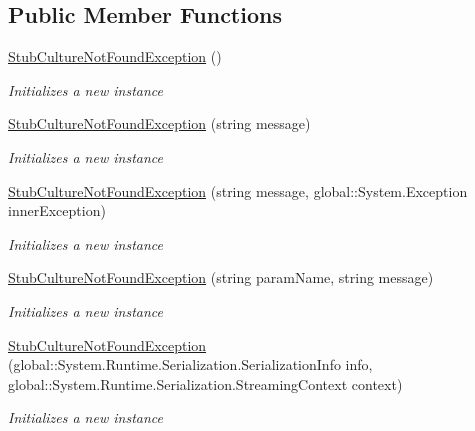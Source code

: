 \subsection*{Public Member Functions}
\begin{DoxyCompactItemize}
\item 
\hyperlink{class_system_1_1_globalization_1_1_fakes_1_1_stub_culture_not_found_exception_adcf0eece1199927a6dc50173ee7ad98c}{Stub\-Culture\-Not\-Found\-Exception} ()
\begin{DoxyCompactList}\small\item\em Initializes a new instance\end{DoxyCompactList}\item 
\hyperlink{class_system_1_1_globalization_1_1_fakes_1_1_stub_culture_not_found_exception_a29f950e846c473945013e507a422dcc8}{Stub\-Culture\-Not\-Found\-Exception} (string message)
\begin{DoxyCompactList}\small\item\em Initializes a new instance\end{DoxyCompactList}\item 
\hyperlink{class_system_1_1_globalization_1_1_fakes_1_1_stub_culture_not_found_exception_a6c06c99c44ff4f4aef65d53683210785}{Stub\-Culture\-Not\-Found\-Exception} (string message, global\-::\-System.\-Exception inner\-Exception)
\begin{DoxyCompactList}\small\item\em Initializes a new instance\end{DoxyCompactList}\item 
\hyperlink{class_system_1_1_globalization_1_1_fakes_1_1_stub_culture_not_found_exception_a92628af440fa433d4c862d8e0c215db1}{Stub\-Culture\-Not\-Found\-Exception} (string param\-Name, string message)
\begin{DoxyCompactList}\small\item\em Initializes a new instance\end{DoxyCompactList}\item 
\hyperlink{class_system_1_1_globalization_1_1_fakes_1_1_stub_culture_not_found_exception_ac2ddcfc2c902ca873f20c4e4386c0859}{Stub\-Culture\-Not\-Found\-Exception} (global\-::\-System.\-Runtime.\-Serialization.\-Serialization\-Info info, global\-::\-System.\-Runtime.\-Serialization.\-Streaming\-Context context)
\begin{DoxyCompactList}\small\item\em Initializes a new instance\end{DoxyCompactList}\item 

\end{DoxyCompactItemize}
